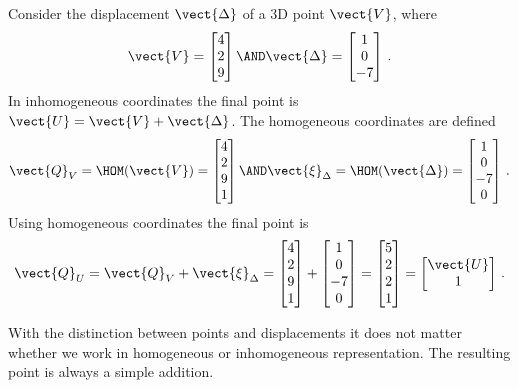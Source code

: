 \documentclass[oneandhalfcolumn]{coursenotes-handout}
\begin{document}
\begin{example}
    Consider the displacement \(\vect{\Delta}\) of a 3D point \(\vect{V}\), where
    \begin{align}
      \vect{V} = \begin{bmatrix} 4 \\ 2 \\ 9\end{bmatrix} \AND
      \vect{\Delta} = \begin{bmatrix} 1 \\ 0 \\ -7\end{bmatrix} \,.
    \end{align}
    In inhomogeneous coordinates the final point is \(\vect{U} = \vect{V} + \vect{\Delta}\). The homogeneous coordinates are defined
    \begin{align}
        \vect{Q}_V = \HOM (\vect{V}) = \begin{bmatrix} 4 \\ 2 \\ 9 \\ 1\end{bmatrix} \AND
        \vect{\xi}_\Delta = \HOM (\vect{\Delta}) = \begin{bmatrix} 1 \\ 0 \\ -7 \\ 0\end{bmatrix} \,.
    \end{align}
    Using homogeneous coordinates the final point is
    \begin{align}
    \vect{Q}_U = \vect{Q}_V + \vect{\xi}_\Delta
               = \begin{bmatrix} 4 \\ 2 \\ 9 \\ 1\end{bmatrix} + \begin{bmatrix} 1 \\ 0 \\ -7 \\ 0\end{bmatrix}
               = \begin{bmatrix} 5 \\ 2 \\ 2 \\ 1\end{bmatrix} = \begin{bmatrix} \vect{U} \\ 1\end{bmatrix}\,.
    \end{align}

    With the distinction between points and displacements it does not matter whether we work in homogeneous or inhomogeneous representation. The resulting point is always a simple addition.
\end{example}
\end{document}
